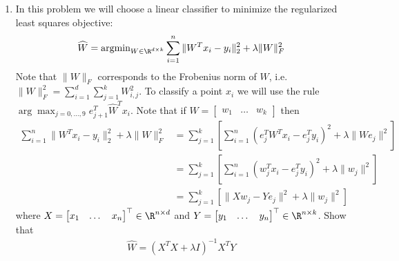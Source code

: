 \documentclass[shortlabels]{article}
\begin{document}
\begin{aprob}
    \begin{enumerate}
        \item {} In this problem we will choose a linear classifier to minimize the regularized least squares objective:
        \begin{align*}
            \widehat{W} = \text{argmin}_{W \in \R^{d \times k}} \sum_{i=1}^{n} \| W^Tx_{i} - y_{i} \|^{2}_{2} + \lambda \|W\|_{F}^{2}
        \end{align*}
        Note that $\|W\|_{F}$ corresponds to the Frobenius norm of $W$, i.e. $\|W\|_{F}^{2} = \sum_{i=1}^d \sum_{j=1}^k W_{i,j}^2$. To classify a point $x_i$ we will use the rule $\arg\max_{j=0,\dots,9} e_{j+1}^T \widehat{W}^T x_i$. Note that if $W = \begin{bmatrix} w_1 & \dots & w_k \end{bmatrix}$ then
        \begin{align*}
            \sum_{i=1}^{n} \| W^Tx_{i} - y_{i} \|^{2}_{2} + \lambda \|W\|_{F}^{2} &= \sum_{j=1}^k \left[  \sum_{i=1}^n ( e_j^T W^T x_i - e_j^T y_i)^2 + \lambda \| W e_j \|^2 \right] \\
            &= \sum_{j=1}^k \left[  \sum_{i=1}^n ( w_j^T x_i - e_j^T y_i)^2 + \lambda \| w_j \|^2 \right] \\
            &= \sum_{j=1}^k \left[  \| X w_j - Y e_j\|^2 + \lambda \| w_j \|^2 \right]
        \end{align*}
        where $X = \begin{bmatrix} x_1 & \dots & x_n \end{bmatrix}^\top \in \R^{n \times d}$ and $Y = \begin{bmatrix} y_1 & \dots & y_n \end{bmatrix}^\top \in \R^{n \times k}$. Show that
        \begin{align*}
            \widehat{W} = (X^T X + \lambda I)^{-1} X^T Y
        \end{align*}



\end{enumerate}
\end{aprob}
\end{document}
